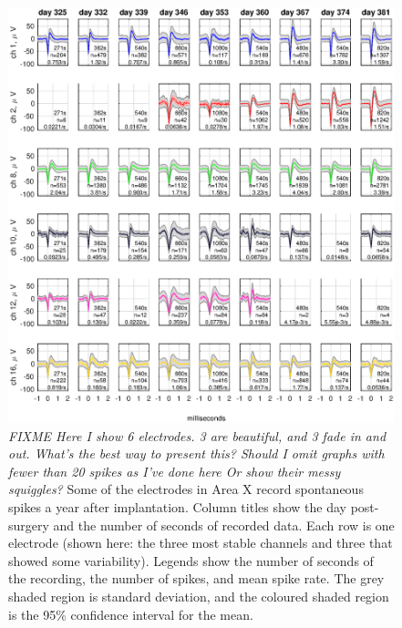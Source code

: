 \documentclass[10pt,letterpaper]{article}
\begin{document}
\begin{figure}
  \includegraphics[width=\textwidth]{XSpikeRecording}
  \caption{{\em FIXME Here I show 6 electrodes.  3 are beautiful, and 3 fade in and out.  What's the best way to present this?  Should I omit graphs with fewer than 20 spikes as I've done here  Or show their messy squiggles?}
    Some of the electrodes in Area X record spontaneous spikes
    a year after implantation.  Column titles show the day
    post-surgery and the number of seconds of recorded data.  Each row
    is one electrode (shown here: the three most stable channels
    and three that showed some variability).  Legends show the number of seconds of the
    recording, the number of spikes, and mean spike rate.  The grey
    shaded region is standard deviation, and the coloured shaded region is
    the 95\% confidence interval for the mean.}
  \label{fig:XSpikeRecording}
\end{figure}
\end{document}
